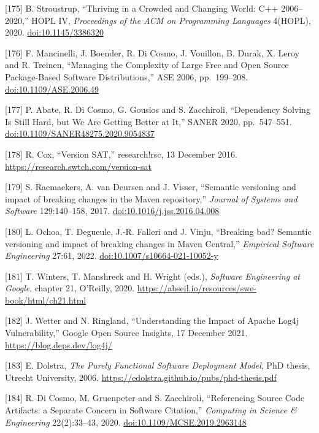 \documentclass[10pt,letterpaper]{article}
\begin{document}
{[}175{]} B. Stroustrup, ``Thriving in a Crowded and Changing World: C++
2006--2020,'' HOPL IV, \emph{Proceedings of the ACM on Programming
Languages} 4(HOPL), 2020.
\href{https://doi.org/10.1145/3386320}{doi:10.1145/3386320}

{[}176{]} F. Mancinelli, J. Boender, R. Di Cosmo, J. Vouillon, B. Durak,
X. Leroy and R. Treinen, ``Managing the Complexity of Large Free and
Open Source Package-Based Software Distributions,'' ASE 2006,
pp.~199--208.
\href{https://doi.org/10.1109/ASE.2006.49}{doi:10.1109/ASE.2006.49}

{[}177{]} P. Abate, R. Di Cosmo, G. Gousios and S. Zacchiroli,
``Dependency Solving Is Still Hard, but We Are Getting Better at It,''
SANER 2020, pp.~547--551.
\href{https://doi.org/10.1109/SANER48275.2020.9054837}{doi:10.1109/SANER48275.2020.9054837}

{[}178{]} R. Cox, ``Version SAT,'' research!rsc, 13 December 2016.
\url{https://research.swtch.com/version-sat}

{[}179{]} S. Raemaekers, A. van Deursen and J. Visser, ``Semantic
versioning and impact of breaking changes in the Maven repository,''
\emph{Journal of Systems and Software} 129:140--158, 2017.
\href{https://doi.org/10.1016/j.jss.2016.04.008}{doi:10.1016/j.jss.2016.04.008}

{[}180{]} L. Ochoa, T. Degueule, J.-R. Falleri and J. Vinju, ``Breaking
bad? Semantic versioning and impact of breaking changes in Maven
Central,'' \emph{Empirical Software Engineering} 27:61, 2022.
\href{https://doi.org/10.1007/s10664-021-10052-y}{doi:10.1007/s10664-021-10052-y}

{[}181{]} T. Winters, T. Manshreck and H. Wright (eds.), \emph{Software
Engineering at Google}, chapter 21, O'Reilly, 2020.
\url{https://abseil.io/resources/swe-book/html/ch21.html}

{[}182{]} J. Wetter and N. Ringland, ``Understanding the Impact of
Apache Log4j Vulnerability,'' Google Open Source Insights, 17 December
2021. \url{https://blog.deps.dev/log4j/}

{[}183{]} E. Dolstra, \emph{The Purely Functional Software Deployment
Model}, PhD thesis, Utrecht University, 2006.
\url{https://edolstra.github.io/pubs/phd-thesis.pdf}

{[}184{]} R. Di Cosmo, M. Gruenpeter and S. Zacchiroli, ``Referencing
Source Code Artifacts: a Separate Concern in Software Citation,''
\emph{Computing in Science \& Engineering} 22(2):33--43, 2020.
\href{https://doi.org/10.1109/MCSE.2019.2963148}{doi:10.1109/MCSE.2019.2963148}
\end{document}
